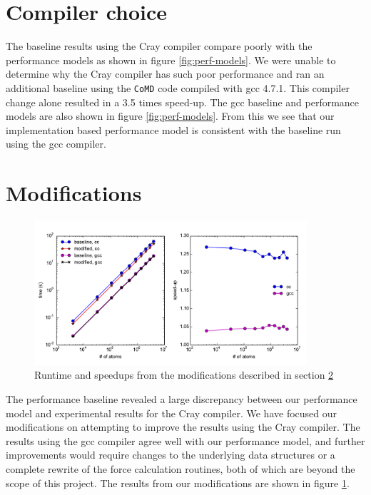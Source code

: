 \documentclass[12pt]{article}
\begin{document}
\section{Compiler choice}
The baseline results using the Cray compiler compare poorly with the
performance models as shown in figure \ref{fig:perf-models}. We were
unable to determine why the Cray compiler has such poor performance
and ran an additional baseline using the \texttt{CoMD} code compiled
with gcc 4.7.1. This compiler change alone resulted in a 3.5 times
speed-up. The gcc baseline and performance models are also shown in
figure \ref{fig:perf-models}. From this we see that our implementation
based performance model is consistent with the baseline run using the
gcc compiler.

\section{Modifications}
\label{sec:mods}

\begin{figure}[h!]
  \centering
  \includegraphics[width=0.9\textwidth]{../figs/modified_forceLJ.pdf}
  \caption{Runtime and speedups from the modifications described in
   section \ref{sec:mods}}
   \label{fig:mod-force}
\end{figure}

The performance baseline revealed a large discrepancy between our
performance model and experimental results for the Cray compiler. We
have focused our modifications on attempting to improve the results
using the Cray compiler. The results using the gcc compiler agree well
with our performance model, and further improvements would require
changes to the underlying data structures or a complete rewrite of the
force calculation routines, both of which are beyond the scope of this
project. The results from our modifications are shown in figure
\ref{fig:mod-force}.
\\
\end{document}
